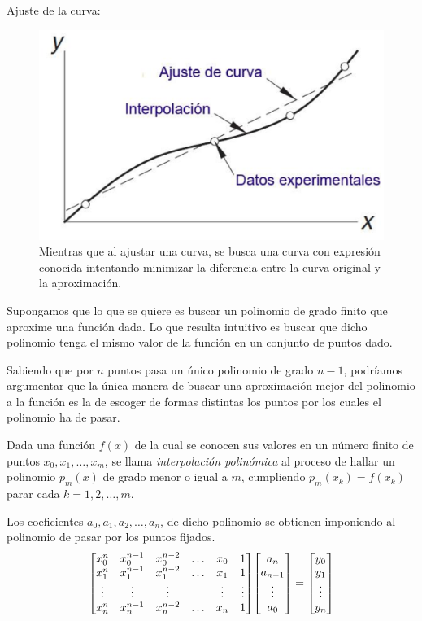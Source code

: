 \documentclass[12pt]{article}
\numberwithin{equation}{section}
\begin{document}
Ajuste de la curva:
\begin{figure}[H]
   \centering
   \includegraphics[scale=0.5]{Imagenes/Interpol03.eps}
   \caption{Mientras que al ajustar una curva, se busca una curva con expresión conocida intentando minimizar la diferencia entre la curva original y la aproximación.}
\end{figure}

Supongamos que lo que se quiere es buscar un polinomio de grado finito que aproxime una función dada. Lo que resulta intuitivo es buscar que dicho polinomio tenga el mismo valor de la función en un conjunto de puntos dado.
\par
Sabiendo que por $n$ puntos pasa un único polinomio de grado $n-1$, podríamos argumentar que la única manera de buscar una aproximación mejor del polinomio a la función es la de escoger de formas distintas los puntos por los cuales el polinomio ha de pasar.
\par
Dada una función $f(x)$ de la cual se conocen sus valores en un número finito de puntos $x_{0}, x_{1}, \ldots, x_{m}$, se llama \emph{interpolación polinómica} al proceso de hallar un polinomio $p_{m}(x)$ de grado menor o igual a $m$, cumpliendo $p_{m}(x_{k}) = f(x_{k})$ parar cada $k = 1, 2, \ldots, m$.
\par
Los coeficientes $a_{0}, a_{1}, a_{2}, \ldots, a_{n}$, de dicho polinomio se obtienen imponiendo al polinomio de pasar por los puntos fijados.
\begin{align*}
\mqty[
x_{0}^{n} & x_{0}^{n-1} & x_{0}^{n-2} & \ldots & x_{0} & 1 \\
x_{1}^{n} & x_{1}^{n-1} & x_{1}^{n-2} & \ldots & x_{1} & 1 \\
\vdots & \vdots & \vdots & & \vdots & \vdots \\
x_{n}^{n} & x_{n}^{n-1} & x_{n}^{n-2} & \ldots & x_{n} & 1 
]
\mqty[
a_{n} \\ a_{n-1} \\ \vdots \\ a_{0}
]
=
\mqty[
y_{0} \\ y_{1} \\ \vdots \\ y_{n}
]
\end{align*}
\end{document}
